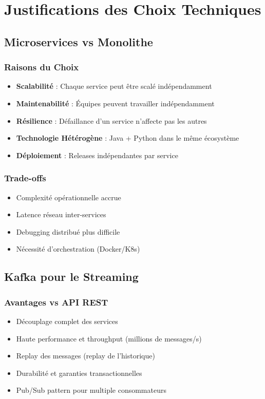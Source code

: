 \documentclass[12pt,a4paper,twoside]{report}
\begin{document}
\chapter{Justifications des Choix Techniques}

\section{Microservices vs Monolithe}

\subsection{Raisons du Choix}
\begin{itemize}
    \item \textbf{Scalabilité} : Chaque service peut être scalé indépendamment
    \item \textbf{Maintenabilité} : Équipes peuvent travailler indépendamment
    \item \textbf{Résilience} : Défaillance d'un service n'affecte pas les autres
    \item \textbf{Technologie Hétérogène} : Java + Python dans le même écosystème
    \item \textbf{Déploiement} : Releases indépendantes par service
\end{itemize}

\subsection{Trade-offs}
\begin{itemize}
    \item Complexité opérationnelle accrue
    \item Latence réseau inter-services
    \item Debugging distribué plus difficile
    \item Nécessité d'orchestration (Docker/K8s)
\end{itemize}

\section{Kafka pour le Streaming}

\subsection{Avantages vs API REST}
\begin{itemize}
    \item Découplage complet des services
    \item Haute performance et throughput (millions de messages/s)
    \item Replay des messages (replay de l'historique)
    \item Durabilité et garanties transactionnelles
    \item Pub/Sub pattern pour multiple consommateurs
\end{itemize}
\end{document}
